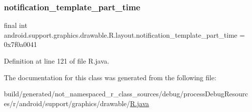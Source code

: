 \subsubsection{\texorpdfstring{notification\_template\_part\_time}{notification\_template\_part\_time}}
{\footnotesize\ttfamily final int android.\+support.\+graphics.\+drawable.\+R.\+layout.\+notification\+\_\+template\+\_\+part\+\_\+time = 0x7f0a0041\hspace{0.3cm}{\ttfamily [static]}}



Definition at line 121 of file R.\+java.



The documentation for this class was generated from the following file\+:\begin{DoxyCompactItemize}
\item 
build/generated/not\+\_\+namespaced\+\_\+r\+\_\+class\+\_\+sources/debug/process\+Debug\+Resources/r/android/support/graphics/drawable/\mbox{\hyperlink{android_2support_2graphics_2drawable_2_r_8java}{R.\+java}}\end{DoxyCompactItemize}
